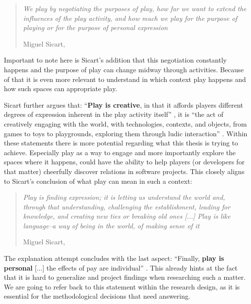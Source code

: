 \begin{quote}
  \textit{We play by negotiating the purposes of play, how far we want to extend the influences of the play activity, and how much we play for the purpose of playing or for the purpose of personal expression}

  \footnotesize{Miguel Sicart, \cite[p. 16]{sicart2014play}}
\end{quote}

Important to note here is Sicart's addition that this negotiation constantly happens and the purpose of play can change midway through activities. Because of that it is even more relevant to understand in which context play happens and how such spaces can appropriate play.

Sicart further argues that: \enquote{\textbf{Play is creative}, in that it affords players different degrees of expression inherent in the play activity itself} \cite[p. 17]{sicart2014play}, it is \enquote{the act of creatively engaging with the world, with technologies, contexts, and objects, from games to toys to playgrounds, exploring them through ludic interaction} \cite[p. 17]{sicart2014play}. Within these statements there is more potential regarding what this thesis is trying to achieve. Especially play as a way to engage and more importantly explore the spaces where it happens, could have the ability to help players (or developers for that matter) cheerfully discover relations in software projects. This closely aligns to Sicart's conclusion of what play can mean in such a context:

\begin{quote}
  \textit{Play is finding expression; it is letting us understand the world and, through  that understanding, challenging the establishment, leading for knowledge, and creating new ties or breaking old ones [...] Play is like language--a way of being in the world, of making sense of it}

  \footnotesize{Miguel Sicart, \cite[p. 18]{sicart2014play}}
\end{quote}

The explanation attempt concludes with the last aspect: \enquote{Finally, \textbf{play is personal} [...] the effects of pay are individual} \cite[p. 17]{sicart2014play}. This already hints at the fact that it is hard to generalize and project findings when researching such a matter. We are going to refer back to this statement within the research design, as it is essential for the methodological decisions that need answering.

